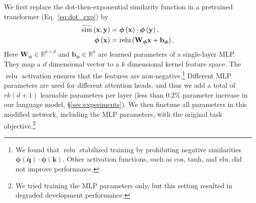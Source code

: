 \documentclass[11pt]{article}
\def\similarity{\mathrm{sim}}
\def\vphi{{\boldsymbol{\phi}}}
\def\vb{{\mathbf{b}}}
\def\vk{{\mathbf{k}}}
\def\vq{{\mathbf{q}}}
\def\vx{{\mathbf{x}}}
\def\vy{{\mathbf{y}}}
\def\mW{{\mathbf{W}}}
\newcommand{\relu}{{\operatorname{relu}}}
\begin{document}
We first replace the dot-then-exponential similarity function in a pretrained transformer (Eq.~\ref{eq:dot_exp}) by
\begin{subequations}
\vspace{-0.5cm}
\begin{align}
\widetilde{\similarity} \left( \vx, \vy\right) 
&= \vphi\left(\vx\right)\cdot \vphi\left(\vy\right),\\
\vphi \left (\vx \right) &=  \relu\left(\mW_{\vphi} \vx + \vb_{\vphi}\right).
\end{align}
\end{subequations}
Here $\mW_\vphi \in \mathbb{R}^{k \times d}$ and $\vb_\vphi \in \mathbb{R}^{k}$ are 
learned parameters
of a single-layer MLP.
They map a $d$ dimensional vector to a $k$ dimensional kernel feature space.
The $\relu$ activation \cite{Fukushima1980} ensures that the features are non-negative.\footnote{We found that $\relu$ stabilized training by prohibiting
negative similarities $\vphi(\vq)\cdot \vphi(\vk)$. Other activation functions, such as $\mathrm{cos}$, $\mathrm{tanh}$, and $\mathrm{elu}$, did not improve performance.} Different MLP parameters are used for different attention heads, and thus we add a total of $rk(d+1)$ learnable parameters per layer (less than 0.2\% parameter increase in our language model, \S\ref{sec:experiments}).
We then finetune all parameters in this modified network, including the MLP parameters, with the original task objective.\footnote{We tried training the MLP parameters only, but this setting resulted in degraded development performance.}
\end{document}
